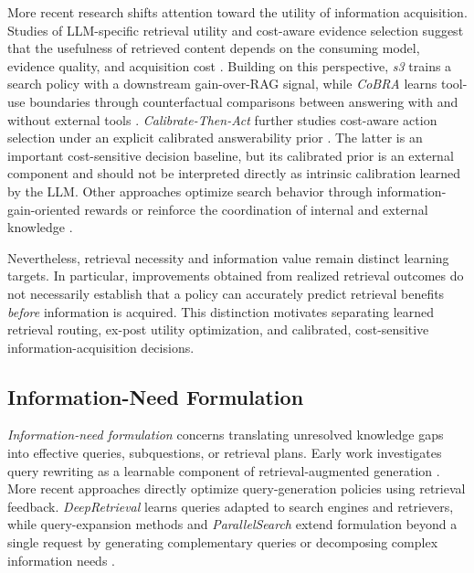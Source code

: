 More recent research shifts attention toward the utility of information acquisition. Studies of LLM-specific retrieval utility and cost-aware evidence selection suggest that the usefulness of retrieved content depends on the consuming model, evidence quality, and acquisition cost \cite{llm_specific_utility,when_knowledge_not_free}. Building on this perspective, \textit{s3} trains a search policy with a downstream gain-over-RAG signal, while \textit{CoBRA} learns tool-use boundaries through counterfactual comparisons between answering with and without external tools \cite{s3,cobra}. \textit{Calibrate-Then-Act} further studies cost-aware action selection under an explicit calibrated answerability prior \cite{calibrate_then_act}. The latter is an important cost-sensitive decision baseline, but its calibrated prior is an external component and should not be interpreted directly as intrinsic calibration learned by the LLM. Other approaches optimize search behavior through information-gain-oriented rewards or reinforce the coordination of internal and external knowledge \cite{info_reasoner,ikea}.

Nevertheless, retrieval necessity and information value remain distinct learning targets. In particular, improvements obtained from realized retrieval outcomes do not necessarily establish that a policy can accurately predict retrieval benefits \emph{before} information is acquired. This distinction motivates separating learned retrieval routing, ex-post utility optimization, and calibrated, cost-sensitive information-acquisition decisions.

\subsection{Information-Need Formulation}
\label{sec:information_need_formulation}

\textit{Information-need formulation} concerns translating unresolved knowledge gaps into effective queries, subquestions, or retrieval plans. Early work investigates query rewriting as a learnable component of retrieval-augmented generation \cite{query_rewriting}. More recent approaches directly optimize query-generation policies using retrieval feedback. \textit{DeepRetrieval} learns queries adapted to search engines and retrievers, while query-expansion methods and \textit{ParallelSearch} extend formulation beyond a single request by generating complementary queries or decomposing complex information needs \cite{deepretrieval,expandsearch,parallelsearch}.

